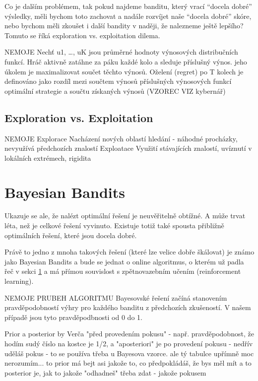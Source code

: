 \documentclass[thesis=M,czech]{FITthesis}[2014/05/07]
\begin{document}
Co je dalším problémem, tak pokud najdeme banditu, který vrací “docela dobré” výsledky, měli bychom toto zachovat a nadále rozvíjet naše “docela dobré” skóre, nebo bychom měli zkoušet i další bandity v naději, že nalezneme ještě lepšího? Tomuto se říká exploration vs. exploitation dilema.

NEMOJE
Nechť u1, …, uK jsou průměrné hodnoty výnosových distribučních funkcí. Hráč aktivně zatáhne za páku každé kolo a sleduje příslušný výnos. jeho úkolem je maximalizovat součet těchto výnosů. Oželení (regret) po T kolech je definováno jako rozdíl mezi součtem výnosů příslušných výnosových funkcí optimální strategie a součtu získaných výnosů (VZOREC VIZ kybernář)

\subsection{Exploration vs. Exploitation}

NEMOJE
Explorace 
Nacházení nových oblastí hledání - náhodné procházky, nevyužívá předchozích znalostí
Exploatace
Využití stávajících znalostí, uvíznutí v lokálních extrémech, rigidita

\section{Bayesian Bandits}

Ukazuje se ale, že nalézt optimální řešení je neuvěřitelně obtížné. A může trvat léta, než je celkové řešení vyvinuto. Existuje totiž také spousta přibližně optimálních řešení, které jsou docela dobré. 

Právě to jedno z mnoha takových řešení (které lze velice dobře škálovat) je známo jako Bayesian Bandits a bude se jednat o online algoritmus, o kterém už padla řeč v sekci \ref{} a má přímou souvislost s zpětnovazebním učením (reinforcement learning).

NEMOJE PRUBEH ALGORITMU
Bayesovské řešení začíná stanovením pravděpodobností výhry pro každého banditu z předchozích zkušeností. V našem případě jsou tyto pravděpodbnosti od 0 do 1. 

Prior a posterior by Verča
"před provedením pokusu" - např. pravděpodobnost, že hodím sudý číslo na kostce je 1/2, a "aposteriori" je po provedení pokusu - nedřív uděláš pokus - to se používa třeba u Bayesova vzorce. ale tý tabulce upřímně moc nerozumím... to prior má bejt asi jakože to, co předpokládáš, že bys měl mít a to posterior je, jak to jakože "odhadneš" třeba  zdat - jakože pokusem
\end{document}
